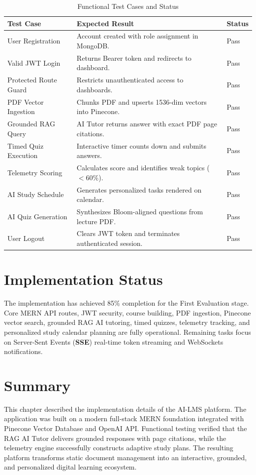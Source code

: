 \begin{table}[H]
\centering
\caption{Functional Test Cases and Status}
\label{tab:testcases}
\begin{tabular}{p{} p{} p{}}
\toprule
\textbf{Test Case} & \textbf{Expected Result} & \textbf{Status} \\
\midrule
User Registration & Account created with role assignment in MongoDB. & Pass \\
Valid JWT Login & Returns Bearer token and redirects to dashboard. & Pass \\
Protected Route Guard & Restricts unauthenticated access to dashboards. & Pass \\
PDF Vector Ingestion & Chunks PDF and upserts 1536-dim vectors into Pinecone. & Pass \\
Grounded RAG Query & AI Tutor returns answer with exact PDF page citations. & Pass \\
Timed Quiz Execution & Interactive timer counts down and submits answers. & Pass \\
Telemetry Scoring & Calculates score and identifies weak topics ($<60\%$). & Pass \\
AI Study Schedule & Generates personalized tasks rendered on calendar. & Pass \\
AI Quiz Generation & Synthesizes Bloom-aligned questions from lecture PDF. & Pass \\
User Logout & Clears JWT token and terminates authenticated session. & Pass \\
\bottomrule
\end{tabular}
\end{table}

\section{Implementation Status}

The implementation has achieved 85\% completion for the First Evaluation stage. Core MERN API routes, JWT security, course building, PDF ingestion, Pinecone vector search, grounded RAG AI tutoring, timed quizzes, telemetry tracking, and personalized study calendar planning are fully operational. Remaining tasks focus on Server-Sent Events (\textbf{SSE}) real-time token streaming and WebSockets notifications.

\section{Summary}

This chapter described the implementation details of the AI-LMS platform. The application was built on a modern full-stack MERN foundation integrated with Pinecone Vector Database and OpenAI API. Functional testing verified that the RAG AI Tutor delivers grounded responses with page citations, while the telemetry engine successfully constructs adaptive study plans. The resulting platform transforms static document management into an interactive, grounded, and personalized digital learning ecosystem.

